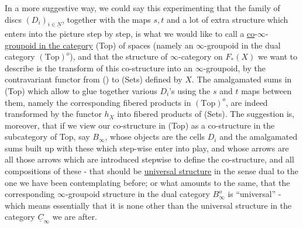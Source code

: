 
In a more suggestive way, we could say  this experimenting that the family of discs $(D_i)_{i\in\underline{N}}$, together with the maps $s,t$ and a lot of extra structure which enters into the picture step by step, is what we would like to call a \uline{co}-$\infty$-\uline{groupoid in the category} (Top) of  spaces (namely an $\infty$-groupoid in the dual category $(\mathrm{Top})^o$), and that the structure of $\infty$-category on $F_*(X)$ we want to describe is the transform of this co-structure into an $\infty$-groupoid, by the contravariant functor from () to (Sets) defined by $X$. The  amalgamated sums in (Top) which allow to glue together  various $D_i$'s using the $s$ and $t$ maps between them, namely the corresponding fibered products in $(\mathrm{Top})^o$, are indeed transformed by the functor $h_X$ into fibered products of (Sets).
The suggestion is, moreover, that if we view our co-structure in (Top) as a co-structure in the subcategory of Top, say $B_\infty$, whose objects are the cells $D_i$ and the amalgamated sums built up with these which step-wise enter into play, and whose arrows are all those arrows which are introduced stepwise to define the co-structure, and all compositions of these - that  should be \uline{ universal structure} in the sense dual to the one we have been contemplating before; or what amounts to  the same, that the corresponding $\infty$-groupoid structure in the dual category $B_\infty^o$ is ``universal'' - which means essentially that it is none other than the universal structure in the category $\underline{C}_\infty$ we are after.

